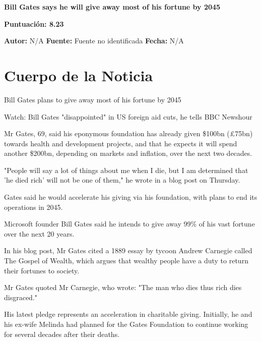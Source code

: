 \documentclass[10pt,a4paper]{article}
\begin{document}
\begin{center}
    {\Huge\bfseries Bill Gates says he will give away most of his fortune by 2045\par}
    \vspace{0.5em}
    {\large\bfseries Puntuación: 8.23\par}
\end{center}
\vspace{1em}

\noindent\textbf{Autor:} N/A \hfill \textbf{Fuente:} Fuente no identificada \hfill \textbf{Fecha:} N/A\par
\vspace{1em}

\section*{Cuerpo de la Noticia}
\setlength{\parskip}{1em}
\setlength{\parindent}{0em}
Bill Gates plans to give away most of his fortune by 2045
\par\medskip
Watch: Bill Gates "disappointed" in US foreign aid cuts, he tells BBC Newshour
\par\medskip
Mr Gates, 69, said his eponymous foundation has already given \$100bn (£75bn) towards health and development projects, and that he expects it will spend another \$200bn, depending on markets and inflation, over the next two decades.
\par\medskip
"People will say a lot of things about me when I die, but I am determined that 'he died rich' will not be one of them," he wrote in a blog post on Thursday.
\par\medskip
Gates said he would accelerate his giving via his foundation, with plans to end its operations in 2045.
\par\medskip
Microsoft founder Bill Gates said he intends to give away 99\% of his vast fortune over the next 20 years.
\par\medskip
In his blog post, Mr Gates cited a 1889 essay by tycoon Andrew Carnegie called The Gospel of Wealth, which argues that wealthy people have a duty to return their fortunes to society.
\par\medskip
Mr Gates quoted Mr Carnegie, who wrote: "The man who dies thus rich dies disgraced."
\par\medskip
His latest pledge represents an acceleration in charitable giving. Initially, he and his ex-wife Melinda had planned for the Gates Foundation to continue working for several decades after their deaths.
\end{document}
